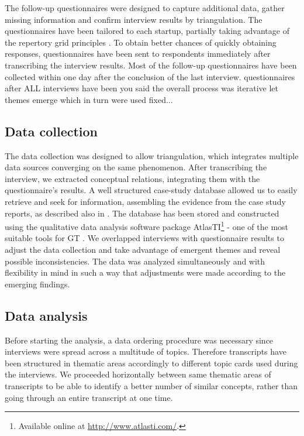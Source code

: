 \documentclass[12pt,journal,compsoc]{../sty/IEEEtran}
\begin{document}
\begin{table}[!t]
The follow-up questionnaires were designed to capture additional data, gather
missing information and confirm interview results by triangulation. The
questionnaires have been tailored to each startup, partially taking advantage of
the repertory grid principles \cite{Edwards2009}. To obtain better chances of
quickly obtaining responses, questionnaires have been sent to respondents
immediately after transcribing the interview results. Most of the follow-up
questionnaires have been collected within one day after the conclusion of the
last interview.    %
questionnaires after ALL interviews have been  %
you said the overall process was iterative  %
let themes emerge which in turn were used %
fixed...

\subsection{Data collection} The data collection was designed to allow
triangulation, which integrates  multiple data sources converging on the same
phenomenon. After transcribing the  interview, we extracted conceptual
relations, integrating them with the  questionnaire's results. A well structured
case-study database allowed us to  easily retrieve and seek for information,
assembling the evidence from the case  study reports, as described also in
\cite{Yin1994}. The database has been stored  and constructed using the
qualitative data analysis software package  AtlasTI\footnote{Available online at
\url{http://www.atlasti.com/}.} - one of  the most suitable tools for GT
\cite{Coleman2007}.  We overlapped interviews with questionnaire results to
adjust the data  collection and take advantage of emergent themes and reveal
possible  inconsistencies. The data was analyzed simultaneously and with
flexibility in  mind in such a way that adjustments were made according to the
emerging  findings.
\subsection{Data analysis} Before starting the analysis, a data ordering
procedure was necessary since  interviews were spread across a multitude of
topics. Therefore transcripts have  been structured in thematic areas
accordingly to different topic cards used  during the interviews. We proceeded
horizontally between same thematic areas of  transcripts to be able to identify
a better number of similar concepts, rather  than going through an entire
transcript at one time.


\end{table}
\end{document}
